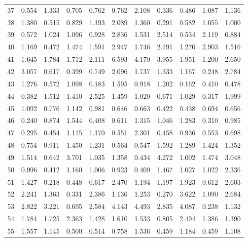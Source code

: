 \begin{tabular}{lrrrrrrrrrr}
37  &  0.554 &  1.333 &  0.705 &  0.762 &  0.762 &  2.108 &  0.336 &  0.486 &  1.087 &  1.136 \\
38  &  1.380 &  0.515 &  0.829 &  1.193 &  2.089 &  1.360 &  0.291 &  0.582 &  1.055 &  1.000 \\
39  &  0.572 &  1.024 &  1.096 &  0.928 &  2.836 &  1.531 &  2.514 &  0.534 &  2.119 &  0.884 \\
40  &  1.169 &  0.472 &  1.474 &  1.591 &  2.947 &  1.746 &  2.191 &  1.270 &  2.903 &  1.516 \\
41  &  1.645 &  1.784 &  1.712 &  2.111 &  6.593 &  4.170 &  3.955 &  1.951 &  1.200 &  2.650 \\
42  &  3.057 &  0.617 &  0.399 &  0.749 &  2.096 &  1.737 &  1.333 &  1.167 &  0.248 &  2.784 \\
43  &  1.276 &  0.572 &  1.098 &  0.183 &  1.595 &  0.918 &  1.202 &  0.162 &  0.410 &  0.478 \\
44  &  0.382 &  1.512 &  1.410 &  2.525 &  1.459 &  1.020 &  0.671 &  1.029 &  0.317 &  1.999 \\
45  &  1.092 &  0.776 &  1.142 &  0.981 &  0.646 &  0.663 &  0.422 &  0.438 &  0.694 &  0.656 \\
46  &  0.240 &  0.874 &  1.544 &  0.408 &  0.611 &  1.315 &  1.046 &  1.283 &  0.310 &  0.985 \\
47  &  0.295 &  0.454 &  1.115 &  1.170 &  0.551 &  2.301 &  0.458 &  0.936 &  0.553 &  0.698 \\
48  &  0.754 &  0.911 &  1.450 &  1.231 &  0.564 &  0.547 &  1.592 &  1.289 &  1.424 &  1.352 \\
49  &  1.514 &  0.642 &  3.701 &  1.035 &  1.358 &  0.434 &  4.272 &  1.002 &  1.474 &  3.048 \\
50  &  0.996 &  0.412 &  1.160 &  1.006 &  0.923 &  0.409 &  1.467 &  1.027 &  1.022 &  2.336 \\
51  &  1.427 &  0.218 &  0.448 &  0.617 &  2.470 &  1.194 &  1.197 &  1.923 &  0.612 &  2.603 \\
52  &  2.241 &  1.363 &  0.331 &  2.386 &  1.136 &  1.253 &  0.270 &  3.622 &  1.090 &  2.684 \\
53  &  2.822 &  3.221 &  0.695 &  2.584 &  4.143 &  4.493 &  2.835 &  4.087 &  0.238 &  1.132 \\
54  &  1.784 &  1.725 &  2.363 &  1.428 &  1.610 &  1.533 &  0.805 &  2.494 &  1.386 &  1.390 \\
55  &  1.557 &  1.145 &  0.500 &  0.514 &  0.758 &  1.536 &  0.459 &  1.184 &  0.459 &  1.108 \\

\end{tabular}
